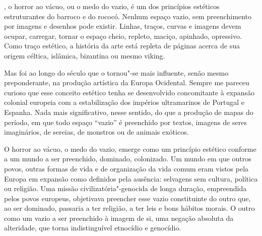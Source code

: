 \vfill

\hspace*{-.4cm}\begin{minipage}[c]{.5\linewidth}
\small{
{}}
\end{minipage}

\pagebreak

\vspace*{1.5cm}


\bigskip

\hfill{}

\bigskip
\bigskip
\bigskip


{}, o horror ao vácuo, ou o medo do vazio, é um dos
princípios estéticos estruturantes do barroco e do rococó. Nenhum espaço
vazio, sem preenchimento por imagens e desenhos pode existir. Linhas,
traços, curvas e imagens devem ocupar, carregar, tornar o espaço cheio,
repleto, maciço, apinhado, opressivo. Como traço estético, a história da
arte está repleta de páginas acerca de sua origem céltica, islâmica,
bizantina ou mesmo viking.

Mas foi ao longo do século  que o {} tornou"-se mais
influente, senão mesmo preponderante, na produção artística da Europa
Ocidental. Sempre me pareceu curioso que esse conceito estético tenha se
desenvolvido concomitante à expansão colonial europeia com a
estabilização dos impérios ultramarinos de Portugal e Espanha. Nada mais
significativo, nesse sentido, do que a produção de mapas do período, em
que todo espaço ``vazio'' é preenchido por textos, imagens de seres
imaginários, de sereias, de monstros ou de animais exóticos.

O horror ao vácuo, o medo do vazio, emerge como um princípio estético
conforme a um mundo a ser preenchido, dominado, colonizado. Um mundo em
que outros povos, outras formas de vida e de organização da vida comum
eram vistos pela Europa em expansão como definidos pela ausência:
selvagens sem cultura, política ou religião. Uma missão
civilizatória"-genocida de longa duração, empreendida pelos povos
europeus, objetivava preencher esse vazio constituinte do outro que, ao
ser dominado, passaria a ter religião, a ter leis e bons hábitos morais.
O outro como um vazio a ser preenchido à imagem de si, uma negação
absoluta da alteridade, que torna indistinguível etnocídio e genocídio.


